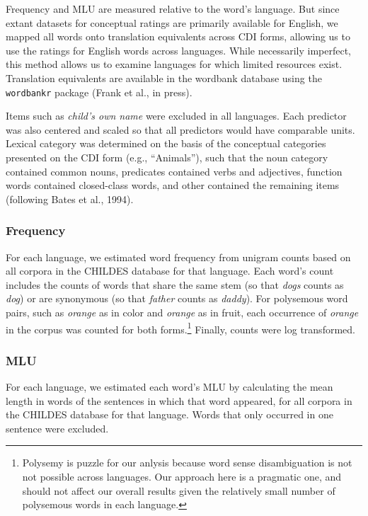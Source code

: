 \documentclass[10pt, letterpaper]{article}
\begin{document}
Frequency and MLU are measured relative to the word's language. But
since extant datasets for conceptual ratings are primarily available for
English, we mapped all words onto translation equivalents across CDI
forms, allowing us to use the ratings for English words across
languages. While necessarily imperfect, this method allows us to examine
languages for which limited resources exist. Translation equivalents are
available in the wordbank database using the \texttt{wordbankr} package
(Frank et al., in press).

Items such as \emph{child's own name} were excluded in all languages.
Each predictor was also centered and scaled so that all predictors would
have comparable units. Lexical category was determined on the basis of
the conceptual categories presented on the CDI form (e.g., ``Animals''),
such that the noun category contained common nouns, predicates contained
verbs and adjectives, function words contained closed-class words, and
other contained the remaining items (following Bates et al., 1994).

\subsubsection{Frequency}\label{frequency}

For each language, we estimated word frequency from unigram counts based
on all corpora in the CHILDES database for that language. Each word's
count includes the counts of words that share the same stem (so that
\emph{dogs} counts as \emph{dog}) or are synonymous (so that
\emph{father} counts as \emph{daddy}). For polysemous word pairs, such
as \emph{orange} as in color and \emph{orange} as in fruit, each
occurrence of \emph{orange} in the corpus was counted for both
forms.\footnote{Polysemy is puzzle for our anlysis because word sense disambiguation is not not possible across languages. Our approach here is a pragmatic one, and should not affect our overall results given the relatively small number of polysemous words in each language.}
Finally, counts were log transformed.

\subsubsection{MLU}\label{mlu}

For each language, we estimated each word's MLU by calculating the mean
length in words of the sentences in which that word appeared, for all
corpora in the CHILDES database for that language. Words that only
occurred in one sentence were excluded.
\end{document}
